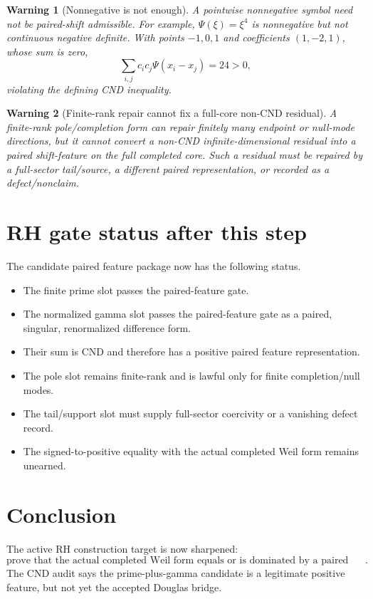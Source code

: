 \documentclass[11pt]{article}
\newtheorem{warning}{Warning}
\begin{document}
\begin{warning}[Nonnegative is not enough]
A pointwise nonnegative symbol need not be paired-shift admissible.  For example,
\(\Psi(\xi)=\xi^4\) is nonnegative but not continuous negative definite.  With
points \(-1,0,1\) and coefficients \((1,-2,1)\), whose sum is zero,
\[
        \sum_{i,j}c_i c_j \Psi(x_i-x_j)=24>0,
\]
violating the defining CND inequality.
\end{warning}

\begin{warning}[Finite-rank repair cannot fix a full-core non-CND residual]
A finite-rank pole/completion form can repair finitely many endpoint or null-mode
directions, but it cannot convert a non-CND infinite-dimensional residual into a
paired shift-feature on the full completed core.  Such a residual must be repaired
by a full-sector tail/source, a different paired representation, or recorded as a
defect/nonclaim.
\end{warning}

\section{RH gate status after this step}
The candidate paired feature package now has the following status.
\begin{itemize}
\item The finite prime slot passes the paired-feature gate.
\item The normalized gamma slot passes the paired-feature gate as a paired, singular,
renormalized difference form.
\item Their sum is CND and therefore has a positive paired feature representation.
\item The pole slot remains finite-rank and is lawful only for finite completion/null
modes.
\item The tail/support slot must supply full-sector coercivity or a vanishing defect
record.
\item The signed-to-positive equality with the actual completed Weil form remains
unearned.
\end{itemize}

\section{Conclusion}
The active RH construction target is now sharpened:
\[
        \boxed{\text{prove that the actual completed Weil form equals or is dominated by
        a paired CND carrier plus lawful pole/tail records}.}
\]
The CND audit says the prime-plus-gamma candidate is a legitimate positive feature,
but not yet the accepted Douglas bridge.
\end{document}
